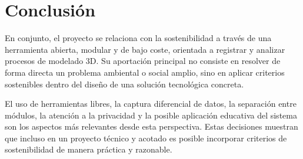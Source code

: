 \section{Conclusión}

En conjunto, el proyecto se relaciona con la sostenibilidad a través de una herramienta abierta, modular y de bajo coste, orientada a registrar y analizar procesos de modelado 3D. Su aportación principal no consiste en resolver de forma directa un problema ambiental o social amplio, sino en aplicar criterios sostenibles dentro del diseño de una solución tecnológica concreta.

El uso de herramientas libres, la captura diferencial de datos, la separación entre módulos, la atención a la privacidad y la posible aplicación educativa del sistema son los aspectos más relevantes desde esta perspectiva. Estas decisiones muestran que incluso en un proyecto técnico y acotado es posible incorporar criterios de sostenibilidad de manera práctica y razonable.

